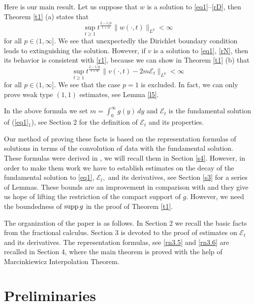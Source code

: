 \documentclass{article}
\def\sE{{\mathscr{E}}}
\def\supp{\hbox{supp}\, }
\begin{document}
Here is our main result. Let us suppose that $w$ is a solution to \eqref{eq1}--\eqref{rD}, then Theorem \ref{t1} (a) states that
$$
\sup_{t\ge 1} t^{\frac{2-1/p}{1+\alpha}} \| w(\cdot , t) \|_{L^p}<\infty
$$
for all $p\in (1, \infty].$ We see that unexpectedly the Dirichlet boundary condition leads to extinguishing the solution. However, if $v$ is a solution to \eqref{eq1}, \eqref{rN}, then its behavior is consistent with \eqref{r1}, because we can show in  Theorem \ref{t1} (b) that
$$
\sup_{t\ge 1} t^{\frac{2-1/p}{1+\alpha}} \| v(\cdot , t) - 2m \sE_t \|_{L^p}<\infty
$$
for all $p\in (1, \infty].$ We see that the case $p=1$ is excluded. In fact, we can only prove weak type $(1,1)$ estimates, see Lemma \ref{l5}.

In the above formula we set $m = \int_0^\infty g(y)\,dy$ and $\sE_t$ is the fundamental solution of (\ref{eq1}$_1$), see Section 2 for the definition of $\sE_t$ and its properties. 

Our method of proving these facts is based on the representation formulas of solutions in terms of the convolution of data with  the fundamental solution. These formulas were derived in \cite{NRS}, we will recall them in Section \ref{s4}. However, in order to make them work we have to establish estimates on the decay of the fundamental solution to \eqref{eq1}, $\sE_t,$ and its derivatives, see Section \ref{s3} for a series of Lemmas. These bounds are an improvement in comparison with \cite{NRS} and they give us hope of lifting the restriction of the compact support of $g$. However, we need the boundedness of $\supp g$ in the proof of Theorem \ref{t1}.

The organization of the paper is as follows. 
In Section 2 we recall the basic facts from the fractional calculus. Section 3 is devoted to the proof of estimates on $\sE_t$ and its derivatives. The representation formulas, see \eqref{rn3.5} and \eqref{rn3.6} are recalled in Section 4, where the main theorem is proved with the help of Marcinkiewicz Interpolation Theorem.


\section{Preliminaries}
\end{document}
